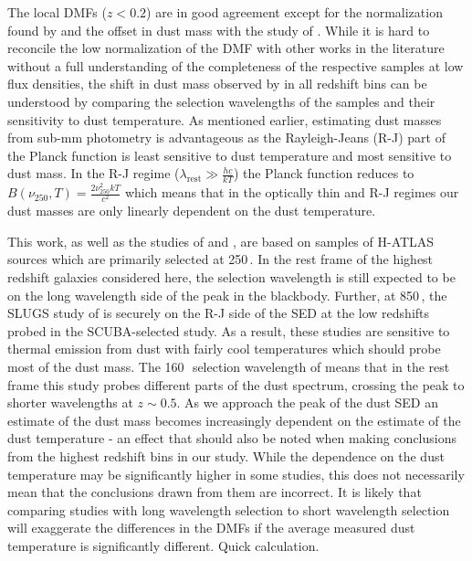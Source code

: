 The local DMFs ($z < 0.2$) are in good agreement except for the normalization found by \citealt{Dunne_2011} and the offset in dust mass with the study of \citealt{Pozzi_2020}. While it is hard to reconcile the low normalization of the \citealt{Dunne_2011} DMF with other works in the literature without a full understanding of the completeness of the respective samples at low flux densities, the shift in dust mass observed by \citealt{Pozzi_2020} in all redshift bins can be understood by comparing the selection wavelengths of the samples and their sensitivity to dust temperature. As mentioned earlier, estimating dust masses from sub-mm photometry is advantageous as the Rayleigh-Jeans (R-J) part of the Planck function is least sensitive to dust temperature and most sensitive to dust mass. In the R-J regime ($\lambda_{\textrm{rest}} \gg \frac{hc}{kT}$) the Planck function reduces to $B(\nu_{250}, T) = \frac{2\nu_{250}^{2}kT}{c^2}$ which means that in the optically thin and R-J regimes our dust masses are only linearly dependent on the dust temperature.

This work, as well as the studies of \citealt{Dunne_2011} and \citealt{Beeston_2018}, are based on samples of H-ATLAS sources which are primarily selected at 250\,\micron. In the rest frame of the highest redshift galaxies considered here, the selection wavelength is still expected to be on the long wavelength side of the peak in the blackbody. Further, at 850\,\micron, the SLUGS study of \citealt{Vlahakis_2005} is securely on the R-J side of the SED at the low redshifts probed in the SCUBA-selected study. As a result, these studies are sensitive to thermal emission from dust with fairly cool temperatures which should probe most of the dust mass. The 160\,\micron\ selection wavelength of \citealt{Pozzi_2020} means that in the rest frame this study probes different parts of the dust spectrum, crossing the peak to shorter wavelengths at $z \sim 0.5$. As we approach the peak of the dust SED an estimate of the dust mass becomes increasingly dependent on the estimate of the dust temperature - an effect that should also be noted when making conclusions from the highest redshift bins in our study. While the dependence on the dust temperature may be significantly higher in some studies, this does not necessarily mean that the conclusions drawn from them are incorrect. It is likely that comparing studies with long wavelength selection to short wavelength selection will exaggerate the differences in the DMFs if the average measured dust temperature is significantly different. {\color{red}Quick calculation.}

